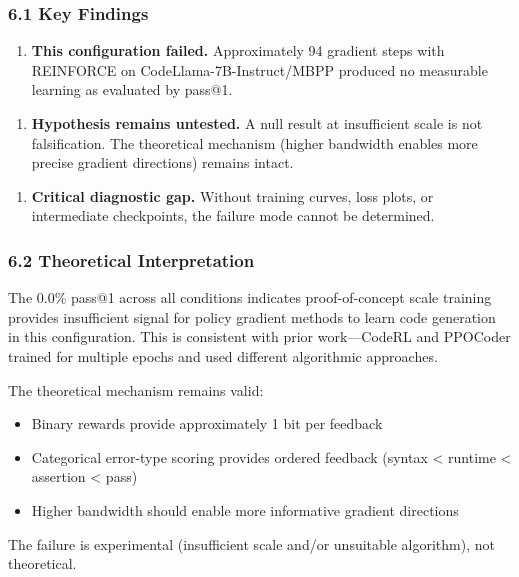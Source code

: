 
\subsubsection{6.1 Key Findings}

\begin{enumerate}
\item \textbf{This configuration failed.} Approximately 94 gradient steps with REINFORCE on CodeLlama-7B-Instruct/MBPP produced no measurable learning as evaluated by pass@1.
\end{enumerate}

\begin{enumerate}
\item \textbf{Hypothesis remains untested.} A null result at insufficient scale is not falsification. The theoretical mechanism (higher bandwidth enables more precise gradient directions) remains intact.
\end{enumerate}

\begin{enumerate}
\item \textbf{Critical diagnostic gap.} Without training curves, loss plots, or intermediate checkpoints, the failure mode cannot be determined.
\end{enumerate}

\subsubsection{6.2 Theoretical Interpretation}

The 0.0\% pass@1 across all conditions indicates proof-of-concept scale training provides insufficient signal for policy gradient methods to learn code generation in this configuration. This is consistent with prior work---CodeRL and PPOCoder trained for multiple epochs and used different algorithmic approaches.

The theoretical mechanism remains valid:
\begin{itemize}
\item Binary rewards provide approximately 1 bit per feedback
\item Categorical error-type scoring provides ordered feedback (syntax < runtime < assertion < pass)
\item Higher bandwidth should enable more informative gradient directions
\end{itemize}

The failure is experimental (insufficient scale and/or unsuitable algorithm), not theoretical.

